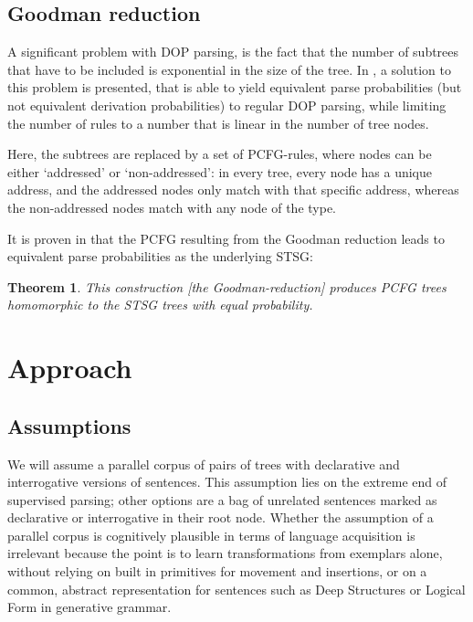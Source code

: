 \documentclass[a4paper]{article}
\newtheorem{theorem}{Theorem}[section]
\theoremstyle{definition}
\begin{document}
\subsection{Goodman reduction}

A significant problem with DOP parsing, is the fact that the number of subtrees
that have to be included is exponential in the size of the tree. In \cite{Go},
a solution to this problem is presented, that is able to yield equivalent parse
probabilities (but not equivalent derivation probabilities) to regular DOP
parsing, while limiting the number of rules to a number that is linear in the
number of tree nodes.

Here, the subtrees are replaced by a set of PCFG-rules, where nodes can be
either `addressed' or `non-addressed': in every tree, every node has a unique
address, and the addressed nodes only match with that specific address, whereas
the non-addressed nodes match with any node of the type.

It is proven in \cite{Go} that the PCFG resulting from the Goodman reduction
leads to equivalent parse probabilities as the underlying STSG:

\begin{theorem}
This construction [the Goodman-reduction] produces PCFG trees homomorphic to
the STSG trees with equal probability.
\end{theorem}

\section{Approach}
\label{sec:approach}

\subsection{Assumptions}

We will assume a parallel corpus of pairs of trees with declarative and
interrogative versions of sentences. This assumption lies on the extreme
end of supervised parsing; other options are a bag of unrelated sentences
marked as declarative or interrogative in their root node. Whether the
assumption of a parallel corpus is cognitively plausible in terms of
language acquisition is irrelevant because the point is to learn
transformations from exemplars alone, without relying on built in primitives
for movement and insertions, or on a common, abstract representation for
sentences such as Deep Structures or Logical Form in generative grammar.
\end{document}
